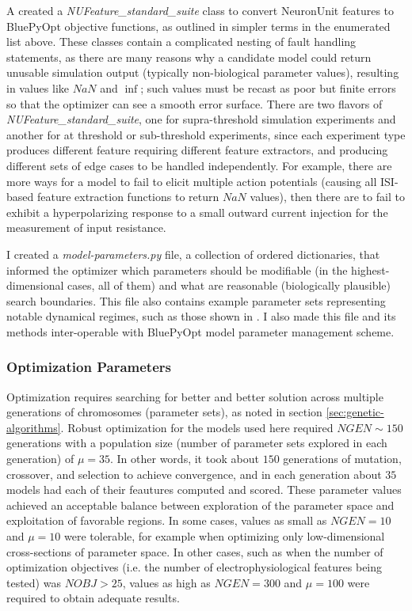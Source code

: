 A created a \emph{NUFeature\_standard\_suite} class to convert NeuronUnit features to BluePyOpt objective functions, as outlined in simpler terms in the enumerated list above.
These classes contain a complicated nesting of fault handling statements, as there are many reasons why a candidate model could return unusable simulation output (typically non-biological parameter values), resulting in values like $NaN$ and $\inf$; such values must be recast as poor but finite errors so that the optimizer can see a smooth error surface.
There are two flavors of \emph{NUFeature\_standard\_suite}, one for supra-threshold simulation experiments and another for at threshold or sub-threshold experiments, since each experiment type produces different feature requiring different feature extractors, and producing different sets of edge cases to be handled independently.
For example, there are more ways for a model to fail to elicit multiple action potentials (causing all ISI-based feature extraction functions to return $NaN$ values), then there are to fail to exhibit a hyperpolarizing response to a small outward current injection for the measurement of input resistance.
 
I created a \emph{model-parameters.py} file, a collection of ordered dictionaries, that informed the optimizer which parameters should be modifiable (in the highest-dimensional cases, all of them) and what are reasonable (biologically plausible) search boundaries.
This file also contains example parameter sets representing notable dynamical regimes, such as those shown in \cite{izhikevich2003simple}.
I also made this file and its methods inter-operable with BluePyOpt model parameter management scheme.

\subsubsection{Optimization Parameters}
Optimization requires searching for better and better solution across multiple generations of chromosomes (parameter sets), as noted in section \ref{sec:genetic-algorithms}.
Robust optimization for the models used here required $NGEN\sim150$ generations with a population size (number of parameter sets explored in each generation) of $\mu=35$.
In other words, it took about $150$ generations of mutation, crossover, and selection to achieve convergence, and in each generation about $35$ models had each of their feautures computed and scored.
These parameter values achieved an acceptable balance between exploration of the parameter space and exploitation of favorable regions.
In some cases, values as small as $NGEN=10$ and $\mu=10$ were tolerable, for example when optimizing only low-dimensional cross-sections of parameter space.
In other cases, such as when the number of optimization objectives (i.e. the number of electrophysiological features being tested) was $NOBJ>25$, values as high as $NGEN=300$ and $\mu=100$ were required to obtain adequate results.

